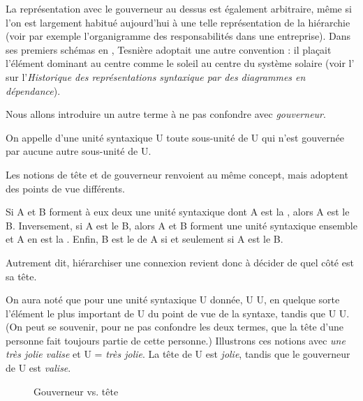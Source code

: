 La représentation avec le gouverneur au dessus est également arbitraire, même si l’on est largement habitué aujourd’hui à une telle représentation de la hiérarchie (voir par exemple l’organigramme des responsabilités dans une entreprise). Dans ses premiers schémas en \citeyear{tesniere1934comment}, Tesnière adoptait une autre convention : il plaçait l’élément dominant au centre comme le soleil au centre du système solaire (voir l’ sur l’\textit{Historique des représentations syntaxique par des diagrammes en dépendance}).

Nous allons introduire un autre terme à ne pas confondre avec \textit{gouverneur}.

{On appelle  d’une unité syntaxique U toute sous-unité de U qui n’est gouvernée par aucune autre sous-unité de U.}

\begin{sloppypar}
Les notions de tête et de gouverneur renvoient au même concept, mais adoptent des points de vue différents.
\end{sloppypar}

{Si A et B forment à eux deux une unité syntaxique dont A est la , alors A est le  B. Inversement, si A est le  B, alors A et B forment une unité syntaxique ensemble et A en est la . Enfin, B est le  de A si et seulement si A est le  B.}

Autrement dit, hiérarchiser une connexion revient donc à décider de quel côté est sa tête.

On aura noté que pour une unité syntaxique U donnée,  U  U, en quelque sorte l’élément le plus important de U du point de vue de la syntaxe, tandis que  U  U. (On peut se souvenir, pour ne pas confondre les deux termes, que la tête d’une personne fait toujours partie de cette personne.) Illustrons ces notions avec \textit{une très jolie valise} et U = \textit{très jolie}. La tête de U est \textit{jolie}, tandis que le gouverneur de U est \textit{valise}.

\begin{figure}
  \caption{Gouverneur vs. tête}
\end{figure}


